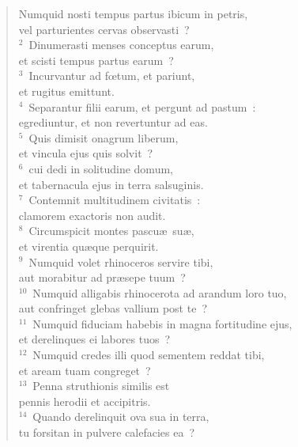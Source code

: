 \begin{flushleft}\begin{verse}\vspace{-19pt}\hspace{6pt}Numquid nosti tempus partus ibicum in petris,\\\hspace{6pt} vel parturientes cervas observasti~?\\
${}^{2}$~Dinumerasti menses conceptus earum,\\ et scisti tempus partus earum~?\\
${}^{3}$~Incurvantur ad fœtum, et pariunt,\\ et rugitus emittunt.\\
${}^{4}$~Separantur filii earum, et pergunt ad pastum~:\\ egrediuntur, et non revertuntur ad eas.\\
${}^{5}$~Quis dimisit onagrum liberum,\\ et vincula ejus quis solvit~?\\
${}^{6}$~cui dedi in solitudine domum,\\ et tabernacula ejus in terra salsuginis.\\
${}^{7}$~Contemnit multitudinem civitatis~:\\ clamorem exactoris non audit.\\
${}^{8}$~Circumspicit montes pascu\ae\ su\ae ,\\ et virentia qu\ae que perquirit.\\
${}^{9}$~Numquid volet rhinoceros servire tibi,\\ aut morabitur ad pr\ae sepe tuum~?\\
${}^{10}$~Numquid alligabis rhinocerota ad arandum loro tuo,\\ aut confringet glebas vallium post te~?\\
${}^{11}$~Numquid fiduciam habebis in magna fortitudine ejus,\\ et derelinques ei labores tuos~?\\
${}^{12}$~Numquid credes illi quod sementem reddat tibi,\\ et aream tuam congreget~?\\
${}^{13}$~Penna struthionis similis est\\ pennis herodii et accipitris.\\
${}^{14}$~Quando derelinquit ova sua in terra,\\ tu forsitan in pulvere calefacies ea~?\\

\end{verse}
\end{flushleft}
